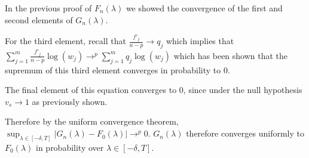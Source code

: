 \documentclass[
]{article}
\begin{document}
In the previous proof of \(F_n(\lambda)\) we showed the convergence of
the first and second elements of \(G_n(\lambda)\).

For the third element, recall that \(\frac{f'_j}{n-p} \rightarrow q_j\)
which implies that
\(\sum_{j=1}^m \frac{f'_j}{n-p}\log(w_j) \rightarrow^p\sum_{j=1}^m q_j\log(w_j)\)
which has been shown that the supremum of this third element converges
in probability to 0.

The final element of this equation converges to \(0\), since under the
null hypothesis \(v_s \rightarrow 1\) as previously shown.

Therefore by the uniform convergence theorem,
\(\sup_{\lambda \in [-\delta,T]} \left|G_n(\lambda) - F_0(\lambda)\right| \rightarrow^p 0\).
\(G_n(\lambda)\) therefore converges uniformly to \(F_0(\lambda)\) in
probability over \(\lambda \in [-\delta, T]\).
\end{document}
